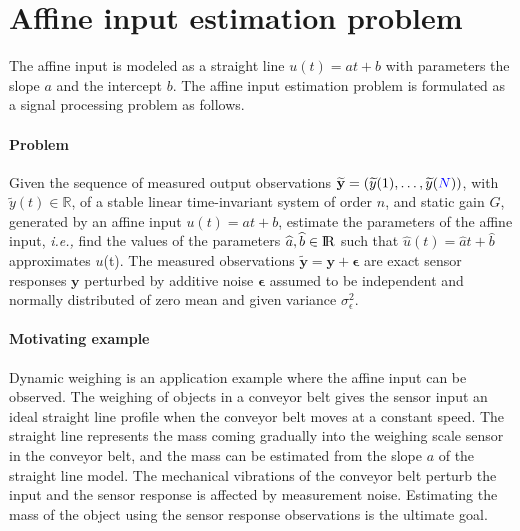 \section{Affine input estimation problem}

The affine input is modeled as a straight line $u(t) = {a} t + {b}$ with parameters the slope $a$ and the intercept $b$.
The affine input estimation problem is formulated as a signal processing problem as follows. 

\paragraph{Problem} 
Given the sequence of measured output observations $\widetilde{\mathbf{y}} = \left( \widetilde{y}(1),\ldots, \widetilde{y}(\color{blue}N\color{black})\right)$, with $\widetilde{y}(t) \in \mathbb{R}$, of a stable linear time-invariant system of order $n$, and static gain ${G}$, generated by an affine input $u(t) = {a} t + {b}$, estimate the parameters of the affine input, \textit{i.e.,} find the values of the parameters $\widehat{a}, \widehat{b} \in {\rm I\!R}$ such that $\widehat{u}(t) = \widehat{a} t + \widehat{b}$ approximates $u$(t).
The measured observations $\widetilde{\mathbf{y}} = {\mathbf{y}} + \bm{\epsilon}$ are exact sensor responses ${\mathbf{y}}$ perturbed by additive noise  $\bm{\epsilon}$ assumed to be independent and normally distributed of zero mean and given variance $\sigma_{\epsilon}^2$.

\paragraph{Motivating example}
Dynamic weighing is an application example where the affine input can be observed.
The weighing of objects in a conveyor belt gives the sensor input an ideal straight line profile when the conveyor belt moves at a constant speed.
The straight line represents the mass coming gradually into the weighing scale sensor in the conveyor belt, and
the mass can be estimated from the slope $a$ of the straight line model. 
The mechanical vibrations of the conveyor belt perturb the input and the sensor response is affected by measurement noise.
Estimating the mass of the object using the sensor response observations is the ultimate goal.

